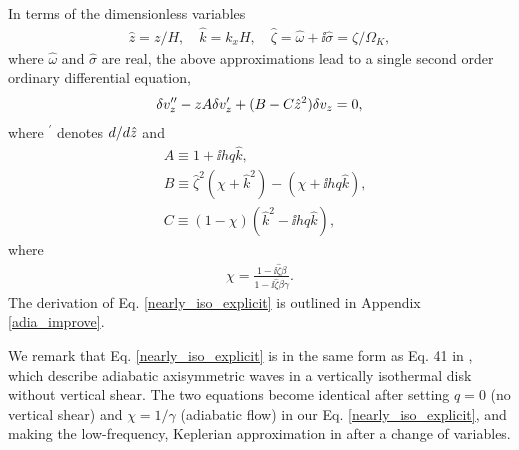  In terms of the dimensionless variables
\begin{align}
  \hat{z} = z/H,\quad \hat{k}=k_xH, \quad \hat{\zeta} =\hat{\omega} +
  \ii\hat{\sigma}= \zeta/\Omega_K,
\end{align}
where $\hat{\omega}$ and $\hat{\sigma}$ are real, the above
approximations lead to a single second order ordinary differential
equation, 
\begin{align}
  \delta v_z^{\prime\prime} - z A\delta v_z^\prime +
  (B - C\hat{z}^2)\delta v_z = 0,\label{nearly_iso_explicit}
\end{align}
where $^\prime$ denotes $d/d\hat{z}$ and 
\begin{align}
  &A \equiv 1 + \ii h q \hat{k},\\
  &B \equiv \hat{\zeta}^2\left(\chi + \hat{k}^2\right) -
  \left(\chi + \ii h q \hat{k}\right),\\
  &C \equiv \left(1-\chi\right)\left(\hat{k}^2 - \ii
    h q\hat{k}\right), 
\end{align}
where
\begin{align}
\chi = \frac{1-\ii\hat{\zeta}\beta}{1-\ii\hat{\zeta}\beta\gamma}.
\end{align}
The derivation of Eq. \ref{nearly_iso_explicit}  is outlined in
Appendix \ref{adia_improve}. 
 
We remark that Eq. \ref{nearly_iso_explicit} is in the same 
form as Eq. 41 in \cite{lubow93}, which describe adiabatic axisymmetric waves in
a vertically isothermal disk without vertical shear. The two equations
become identical after  setting $q=0$ (no vertical shear) and
$\chi=1/\gamma$ (adiabatic flow) in our Eq. \ref{nearly_iso_explicit},
and making the low-frequency, Keplerian approximation in
\citeauthor{lubow93} after a change of variables.    

